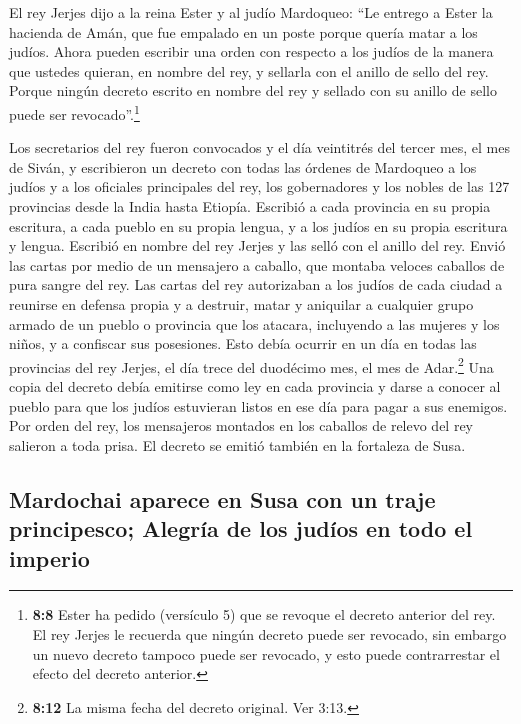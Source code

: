  El rey Jerjes dijo a la reina Ester y al judío Mardoqueo:
``Le entrego a Ester la hacienda de Amán, que fue empalado en un poste
porque quería matar a los judíos.  Ahora pueden escribir
una orden con respecto a los judíos de la manera que ustedes quieran, en
nombre del rey, y sellarla con el anillo de sello del rey. Porque ningún
decreto escrito en nombre del rey y sellado con su anillo de sello puede
ser revocado''.\footnote{\textbf{8:8} Ester ha pedido (versículo 5) que
  se revoque el decreto anterior del rey. El rey Jerjes le recuerda que
  ningún decreto puede ser revocado, sin embargo un nuevo decreto
  tampoco puede ser revocado, y esto puede contrarrestar el efecto del
  decreto anterior.}

 Los secretarios del rey fueron convocados y el día
veintitrés del tercer mes, el mes de Siván, y escribieron un decreto con
todas las órdenes de Mardoqueo a los judíos y a los oficiales
principales del rey, los gobernadores y los nobles de las 127 provincias
desde la India hasta Etiopía. Escribió a cada provincia en su propia
escritura, a cada pueblo en su propia lengua, y a los judíos en su
propia escritura y lengua.  Escribió en nombre del rey
Jerjes y las selló con el anillo del rey. Envió las cartas por medio de
un mensajero a caballo, que montaba veloces caballos de pura sangre del
rey.  Las cartas del rey autorizaban a los judíos de cada
ciudad a reunirse en defensa propia y a destruir, matar y aniquilar a
cualquier grupo armado de un pueblo o provincia que los atacara,
incluyendo a las mujeres y los niños, y a confiscar sus posesiones.
 Esto debía ocurrir en un día en todas las provincias del
rey Jerjes, el día trece del duodécimo mes, el mes de Adar.\footnote{\textbf{8:12}
  La misma fecha del decreto original. Ver 3:13.}  Una
copia del decreto debía emitirse como ley en cada provincia y darse a
conocer al pueblo para que los judíos estuvieran listos en ese día para
pagar a sus enemigos.  Por orden del rey, los mensajeros
montados en los caballos de relevo del rey salieron a toda prisa. El
decreto se emitió también en la fortaleza de Susa.

\hypertarget{mardochai-aparece-en-susa-con-un-traje-principesco-alegruxeda-de-los-juduxedos-en-todo-el-imperio}{%
\subsection{Mardochai aparece en Susa con un traje principesco; Alegría
de los judíos en todo el
imperio}\label{mardochai-aparece-en-susa-con-un-traje-principesco-alegruxeda-de-los-juduxedos-en-todo-el-imperio}}

